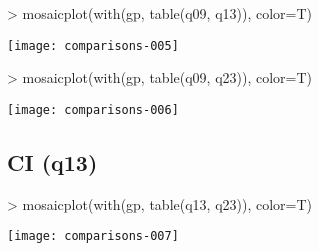 \documentclass[11pt]{article}
\begin{document}
\begin{Schunk}
\begin{Sinput}
> mosaicplot(with(gp, table(q09, q13)), color=T)
\end{Sinput}
\end{Schunk}
\texttt{[image: comparisons-005]}

\begin{Schunk}
\begin{Sinput}
> mosaicplot(with(gp, table(q09, q23)), color=T)
\end{Sinput}
\end{Schunk}
\texttt{[image: comparisons-006]}
\subsection{CI (q13)}
\label{sec-1-3}
\begin{Schunk}
\begin{Sinput}
> mosaicplot(with(gp, table(q13, q23)), color=T)
\end{Sinput}
\end{Schunk}
\texttt{[image: comparisons-007]}
\end{document}
